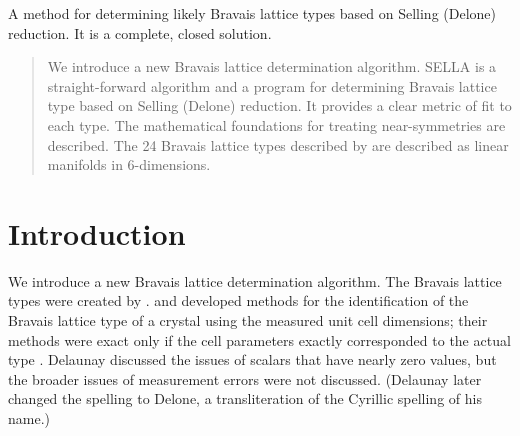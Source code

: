 \documentclass[preprint]{iucr}              %
\begin{document}
	\begin{synopsis}
		A method for determining likely Bravais lattice types based on Selling (Delone) 
		reduction. It is a complete, closed solution.
	\end{synopsis}
	
	\begin{abstract}
		We introduce a new Bravais lattice determination algorithm. SELLA is a 
		straight-forward algorithm and a program for determining Bravais lattice type 
		based on Selling (Delone) reduction. It provides a clear metric of fit to each type. The mathematical foundations for treating near-symmetries are
		described. The 24 Bravais lattice types described by  
		are described as linear manifolds in 6-dimensions.
	\end{abstract}
	
	
	
	\section{Introduction}
	
	We introduce a new Bravais lattice determination algorithm. The Bravais 
	lattice types were created by .  
	and  developed methods for the identification 
	of the Bravais lattice type of a crystal using the measured unit cell 
	dimensions; their methods were exact only if the cell parameters 
	exactly corresponded to the actual type \cite{Patterson1957}. 
	Delaunay \cite{Delaunay1932} discussed the issues of scalars that have nearly zero values, 
	but the broader issues of measurement errors were not 
	discussed. (Delaunay later changed the spelling to Delone, a
	transliteration of the Cyrillic spelling of his name.)
	
\end{document}
